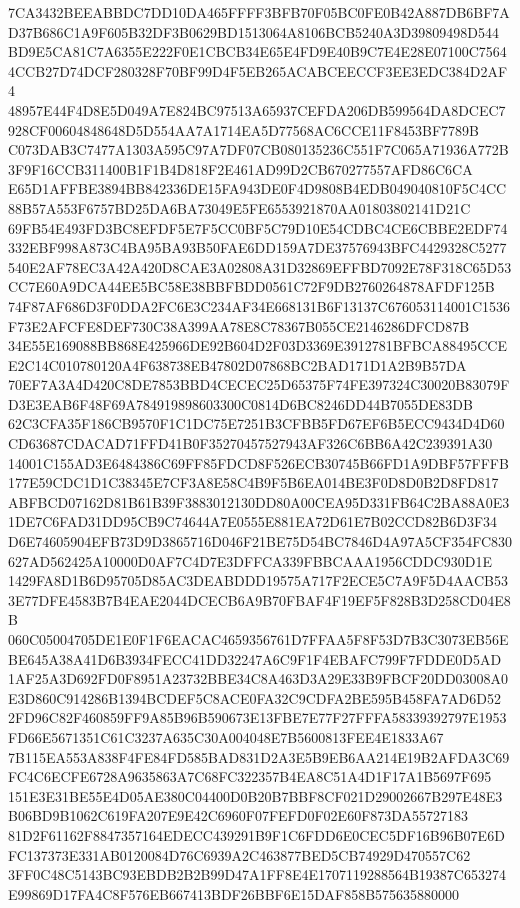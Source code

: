 \documentclass[UTF8,fontset=fandol,zihao=-4,a4paper]{ctexart}
\begin{document}
{{7CA3432BEEABBDC7DD10DA465FFFF3BFB70F05BC0FE0B42A887DB6BF7AD37B686C1A9F605B32DF3B0629BD1513064A8106BCB5240A3D39809498D544
BD9E5CA81C7A6355E222F0E1CBCB34E65E4FD9E40B9C7E4E28E07100C75644CCB27D74DCF280328F70BF99D4F5EB265ACABCEECCF3EE3EDC384D2AF4
48957E44F4D8E5D049A7E824BC97513A65937CEFDA206DB599564DA8DCEC7928CF00604848648D5D554AA7A1714EA5D77568AC6CCE11F8453BF7789B
C073DAB3C7477A1303A595C97A7DF07CB080135236C551F7C065A71936A772B3F9F16CCB311400B1F1B4D818F2E461AD99D2CB670277557AFD86C6CA
E65D1AFFBE3894BB842336DE15FA943DE0F4D9808B4EDB049040810F5C4CC88B57A553F6757BD25DA6BA73049E5FE6553921870AA01803802141D21C
69FB54E493FD3BC8EFDF5E7F5CC0BF5C79D10E54CDBC4CE6CBBE2EDF74332EBF998A873C4BA95BA93B50FAE6DD159A7DE37576943BFC4429328C5277
540E2AF78EC3A42A420D8CAE3A02808A31D32869EFFBD7092E78F318C65D53CC7E60A9DCA44EE5BC58E38BBFBDD0561C72F9DB2760264878AFDF125B
74F87AF686D3F0DDA2FC6E3C234AF34E668131B6F13137C676053114001C1536F73E2AFCFE8DEF730C38A399AA78E8C78367B055CE2146286DFCD87B
34E55E169088BB868E425966DE92B604D2F03D3369E3912781BFBCA88495CCEE2C14C010780120A4F638738EB47802D07868BC2BAD171D1A2B9B57DA
70EF7A3A4D420C8DE7853BBD4CECEC25D65375F74FE397324C30020B83079FD3E3EAB6F48F69A784919898603300C0814D6BC8246DD44B7055DE83DB
62C3CFA35F186CB9570F1C1DC75E7251B3CFBB5FD67EF6B5ECC9434D4D60CD63687CDACAD71FFD41B0F35270457527943AF326C6BB6A42C239391A30
14001C155AD3E6484386C69FF85FDCD8F526ECB30745B66FD1A9DBF57FFFB177E59CDC1D1C38345E7CF3A8E58C4B9F5B6EA014BE3F0D8D0B2D8FD817
ABFBCD07162D81B61B39F3883012130DD80A00CEA95D331FB64C2BA88A0E31DE7C6FAD31DD95CB9C74644A7E0555E881EA72D61E7B02CCD82B6D3F34
D6E74605904EFB73D9D3865716D046F21BE75D54BC7846D4A97A5CF354FC830627AD562425A10000D0AF7C4D7E3DFFCA339FBBCAAA1956CDDC930D1E
1429FA8D1B6D95705D85AC3DEABDDD19575A717F2ECE5C7A9F5D4AACB533E77DFE4583B7B4EAE2044DCECB6A9B70FBAF4F19EF5F828B3D258CD04E8B
060C05004705DE1E0F1F6EACAC4659356761D7FFAA5F8F53D7B3C3073EB56EBE645A38A41D6B3934FECC41DD32247A6C9F1F4EBAFC799F7FDDE0D5AD
1AF25A3D692FD0F8951A23732BBE34C8A463D3A29E33B9FBCF20DD03008A0E3D860C914286B1394BCDEF5C8ACE0FA32C9CDFA2BE595B458FA7AD6D52
2FD96C82F460859FF9A85B96B590673E13FBE7E77F27FFFA58339392797E1953FD66E5671351C61C3237A635C30A004048E7B5600813FEE4E1833A67
7B115EA553A838F4FE84FD585BAD831D2A3E5B9EB6AA214E19B2AFDA3C69FC4C6ECFE6728A9635863A7C68FC322357B4EA8C51A4D1F17A1B5697F695
151E3E31BE55E4D05AE380C04400D0B20B7BBF8CF021D29002667B297E48E3B06BD9B1062C619FA207E9E42C6960F07FEFD0F02E60F873DA55727183
81D2F61162F8847357164EDECC439291B9F1C6FDD6E0CEC5DF16B96B07E6DFC137373E331AB0120084D76C6939A2C463877BED5CB74929D470557C62
3FF0C48C5143BC93EBDB2B2B99D47A1FF8E4E1707119288564B19387C653274E99869D17FA4C8F576EB667413BDF26BBF6E15DAF858B575635880000
}}
\end{document}
